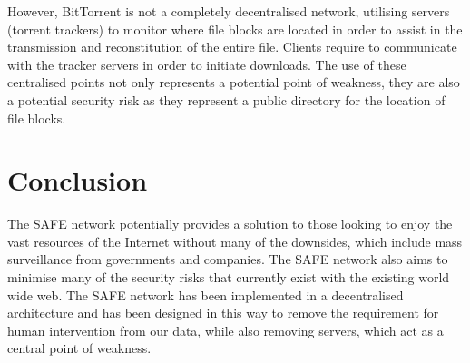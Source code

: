 \documentclass[twocolumn,english]{article}
\begin{document}
However, BitTorrent is not a completely decentralised network, utilising servers (torrent trackers) to monitor where file blocks are located in order to assist in the transmission and 
reconstitution of the entire file. Clients require to communicate with the tracker servers in order to initiate downloads. The use of these centralised points not only represents a potential
point of weakness, they are also a potential security risk as they represent a public directory for the location of file blocks.

\section*{Conclusion}

The SAFE network potentially provides a solution to those looking
to enjoy the vast resources of the Internet without many of the downsides,
which include mass surveillance from governments and companies. The SAFE
network also aims to minimise many of the security risks that currently
exist with the existing world wide web. The SAFE network has been implemented
in a decentralised architecture and has been designed in this way
to remove the requirement for human intervention from our data, while
also removing servers, which act as a central point of weakness.
\end{document}

